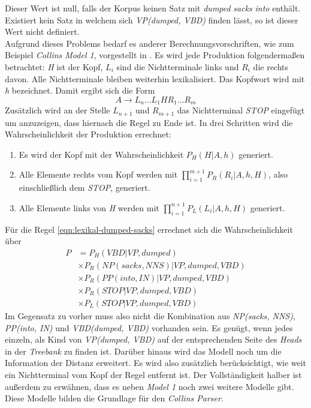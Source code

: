 Dieser Wert ist null, falls der Korpus keinen Satz mit \textit{dumped} \textit{sacks} \textit{into} enthält. Existiert kein Satz in welchem sich \textit{VP(dumped, VBD)} finden lässt, so ist dieser Wert nicht definiert. \\
Aufgrund dieses Problems bedarf es anderer Berechnungsvorschriften, wie zum Beispiel \textit{Collins Model 1}, vorgestellt in \cite{collinsModel}. %
Es wird jede Produktion folgendermaßen betrachtet: \textit{H} ist der Kopf, \( L_i \) sind die Nichtterminale links und \( R_i \) die rechts davon. Alle Nichtterminale bleiben weiterhin lexikalisiert. Das Kopfwort wird mit \textit{h} bezeichnet. Damit ergibt sich die Form
\[ A \to L_n...L_1 H R_1...R_m \]
Zusätzlich wird an der Stelle \( L_{n+1} \) und \( R_{m+1} \) das Nichtterminal \textit{STOP} eingefügt um anzuzeigen, dass hiernach die Regel zu Ende ist. In drei Schritten wird die Wahrscheinlichkeit der Produktion errechnet:
\begin{enumerate}
\item Es wird der Kopf mit der Wahrscheinlichkeit \( P_H(H | A, h) \) generiert.
\item Alle Elemente rechts vom Kopf werden mit \( \displaystyle\prod_{i = 1}^{m+1} P_R(R_i | A, h, H) \), also einschließlich dem \textit{STOP}, generiert.
\item Alle Elemente links von \textit{H} werden mit \( \displaystyle\prod_{i = 1}^{n+1} P_L(L_i | A, h, H) \) generiert.
\end{enumerate}
Für die Regel \ref{eqn:lexikal-dumped-sacks} errechnet sich die Wahrscheinlichkeit über
\begin{align}
P & = P_H(VBD|VP, dumped) \nonumber \\ & \times P_R(NP(sacks, NNS)|VP, dumped, VBD) \nonumber \\ & \times P_R(PP(into, IN)|VP, dumped, VBD) \nonumber \\ & \times P_R(STOP|VP, dumped, VBD) \nonumber \\ & \times P_L(STOP|VP, dumped, VBD)
\end{align}
Im Gegensatz zu vorher muss also nicht die Kombination aus \textit{NP(sacks, NNS)}, \textit{PP(into, IN)} und \textit{VBD(dumped, VBD)} vorhanden sein. Es genügt, wenn jedes einzeln, als Kind von \textit{VP(dumped, VBD)} auf der entsprechenden Seite des \textit{Heads} in der \textit{Treebank} zu finden ist. %
Darüber hinaus wird das Modell noch um die Information der Distanz erweitert. Es wird also zusätzlich berücksichtigt, wie weit ein Nichtterminal vom Kopf der Regel entfernt ist. 
Der Vollständigkeit halber ist außerdem zu erwähnen, dass es neben \textit{Model 1} noch zwei weitere Modelle gibt. Diese Modelle bilden die Grundlage für den \textit{Collins Parser}. %